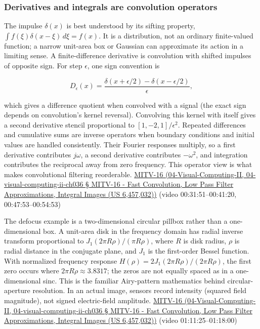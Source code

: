 \subsubsection{Derivatives and integrals are convolution operators}\label{derivatives-and-integrals-are-convolution-operators}

The impulse \(\delta(x)\) is best understood by its sifting property, \(\int f(\xi)\delta(x-\xi)\,d\xi=f(x)\). It is a distribution, not an ordinary finite-valued function; a narrow unit-area box or Gaussian can approximate its action in a limiting sense. A finite-difference derivative is convolution with shifted impulses of opposite sign. For step \(\epsilon\), one sign convention is

\[
D_\epsilon(x)=\frac{\delta(x+\epsilon/2)-\delta(x-\epsilon/2)}{\epsilon},
\]

which gives a difference quotient when convolved with a signal (the exact sign depends on convolution's kernel reversal). Convolving this kernel with itself gives a second derivative stencil proportional to \([1,-2,1]/\epsilon^2\). Repeated differences and cumulative sums are inverse operators when boundary conditions and initial values are handled consistently. Their Fourier responses multiply, so a first derivative contributes \(j\omega\), a second derivative contributes \(-\omega^2\), and integration contributes the reciprocal away from zero frequency. This operator view is what makes convolutional filtering reorderable. \href{}{MITV-16 (04-Visual-Computing-II, 04-visual-computing-ii-ch036 § MITV-16 - Fast Convolution, Low Pass Filter Approximations, Integral Images (US 6,457,032))} (video 00:31:51--00:41:20, 00:47:53--00:54:53)

The defocus example is a two-dimensional circular pillbox rather than a one-dimensional box. A unit-area disk in the frequency domain has radial inverse transform proportional to \(J_1(2\pi R\rho)/(\pi R\rho)\), where \(R\) is disk radius, \(\rho\) is radial distance in the conjugate plane, and \(J_1\) is the first-order Bessel function. With normalized frequency response \(H(\rho)=2J_1(2\pi R\rho)/(2\pi R\rho)\), the first zero occurs where \(2\pi R\rho\approx3.8317\); the zeros are not equally spaced as in a one-dimensional sinc. This is the familiar Airy-pattern mathematics behind circular-aperture resolution. In an actual image, sensors record intensity (squared field magnitude), not signed electric-field amplitude. \href{}{MITV-16 (04-Visual-Computing-II, 04-visual-computing-ii-ch036 § MITV-16 - Fast Convolution, Low Pass Filter Approximations, Integral Images (US 6,457,032))} (video 01:11:25--01:18:00)

